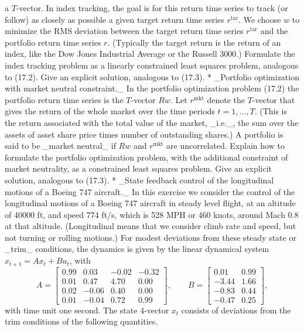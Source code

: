 a \(T\)-vector. In index tracking, the goal is for this return time series to track (or follow) as closely as possible a given target return time series \(r^{\text{tar}}\). We choose \(w\) to minimize the RMS deviation between the target return time series \(r^{\text{tar}}\) and the portfolio return time series \(r\). (Typically the target return is the return of an index, like the Dow Jones Industrial Average or the Russell 3000.) Formulate the index tracking problem as a linearly constrained least squares problem, analogous to (17.2). Give an explicit solution, analogous to (17.3).
* _Portfolio optimization with market neutral constraint._ In the portfolio optimization problem (17.2) the portfolio return time series is the \(T\)-vector \(Rw\). Let \(r^{\text{mkt}}\) denote the \(T\)-vector that gives the return of the whole market over the time periods \(t=1,\dots,T\). (This is the return associated with the total value of the market, _i.e._, the sum over the assets of asset share price times number of outstanding shares.) A portfolio is said to be _market neutral_ if \(Rw\) and \(r^{\text{mkt}}\) are uncorrelated. Explain how to formulate the portfolio optimization problem, with the additional constraint of market neutrality, as a constrained least squares problem. Give an explicit solution, analogous to (17.3).
* _State feedback control of the longitudinal motions of a Boeing 747 aircraft._ In this exercise we consider the control of the longitudinal motions of a Boeing 747 aircraft in steady level flight, at an altitude of 40000 ft, and speed 774 ft/s, which is 528 MPH or 460 knots, around Mach 0.8 at that altitude. (Longitudinal means that we consider climb rate and speed, but not turning or rolling motions.) For modest deviations from these steady state or _trim_ conditions, the dynamics is given by the linear dynamical system \(x_{t+1}=Ax_{t}+Bu_{t}\), with \[A=\left[\begin{array}{cccc}0.99&0.03&-0.02&-0.32\\ 0.01&0.47&4.70&0.00\\ 0.02&-0.06&0.40&0.00\\ 0.01&-0.04&0.72&0.99\end{array}\right],\qquad B=\left[\begin{array}{cccc}0. 01&0.99\\ -3.44&1.66\\ -0.83&0.44\\ -0.47&0.25\end{array}\right],\] with time unit one second. The state 4-vector \(x_{t}\) consists of deviations from the trim conditions of the following quantities.
